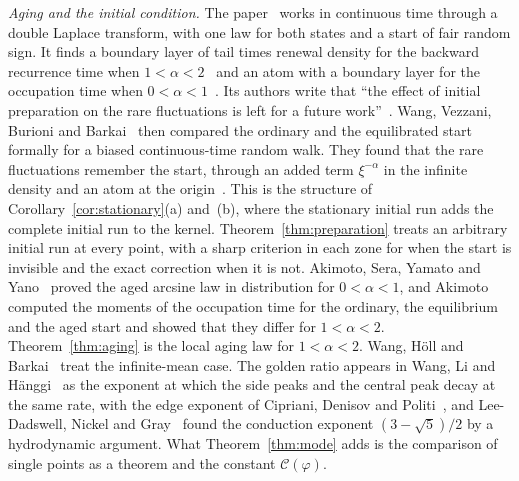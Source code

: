 \emph{Aging and the initial condition.} The paper~\cite{wsdb2018} works in continuous time
through a double Laplace transform, with one law for both states and a start of fair random
sign. It finds a boundary layer of tail times renewal density for the backward recurrence
time when $1<\alpha<2$~\cite[Eq.~(52)]{wsdb2018} and an atom with a boundary layer for the
occupation time when $0<\alpha<1$~\cite[Section~VII.A]{wsdb2018}. Its authors write that
``the effect of initial preparation on the rare fluctuations is left for a future
work''~\cite[Section~VIII]{wsdb2018}. Wang, Vezzani, Burioni and Barkai~\cite{wvbb2019} then
compared the ordinary and the equilibrated start formally for a biased continuous-time random
walk. They found that the rare fluctuations remember the start, through an added term
$\xi^{-\alpha}$ in the infinite density and an atom at the origin~\cite[Eqs.~(28), (46)
and~(47)]{wvbb2019}. This is the structure of Corollary~\ref{cor:stationary}(a) and~(b),
where the stationary initial run adds the complete initial run to the kernel.
Theorem~\ref{thm:preparation} treats an arbitrary initial run at every point, with a sharp
criterion in each zone for when the start is invisible and the exact correction when it is
not. Akimoto, Sera, Yamato and Yano~\cite{asyy2020} proved the aged arcsine law in
distribution for $0<\alpha<1$, and Akimoto~\cite{akimoto2023} computed the moments of the
occupation time for the ordinary, the equilibrium and the aged start and showed that they
differ for $1<\alpha<2$. Theorem~\ref{thm:aging} is the local aging law for $1<\alpha<2$. Wang,
H\"oll and Barkai~\cite{whb2020} treat the infinite-mean case. The golden ratio appears in
Wang, Li and H\"anggi~\cite{wlh2016} as the exponent at which the side peaks and the central
peak decay at the same rate, with the edge exponent of Cipriani, Denisov and
Politi~\cite{cdp2005}, and Lee-Dadswell, Nickel and Gray~\cite{ldng2005} found the conduction
exponent $(3-\sqrt5)/2$ by a hydrodynamic argument. What Theorem~\ref{thm:mode} adds is the
comparison of single points as a theorem and the constant $\mathcal C(\varphi)$.

